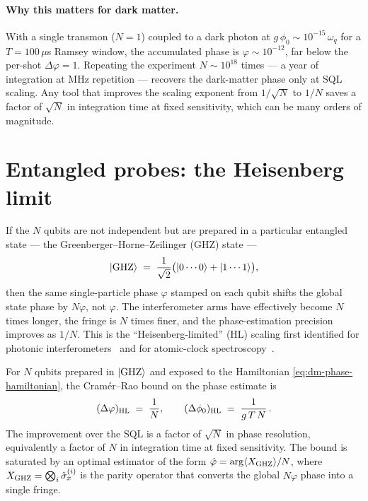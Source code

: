 \paragraph{Why this matters for dark matter.}
With a single transmon ($N=1$) coupled to a dark photon at
$g\,\phi_0\sim 10^{-15}\,\omega_q$ for a $T=100\,\mu$s
Ramsey window, the accumulated phase is $\varphi\sim 10^{-12}$,
far below the per-shot $\Delta\varphi=1$. Repeating the
experiment $N\sim 10^{18}$ times --- a year of integration
at MHz repetition --- recovers the dark-matter phase only at
SQL scaling. Any tool that improves the scaling exponent from
$1/\sqrt N$ to $1/N$ saves a factor of $\sqrt{N}$ in
integration time at fixed sensitivity, which can be
many orders of magnitude.

\section{Entangled probes: the Heisenberg limit}
\label{sec:hl}

\begin{phenomenon}
If the $N$ qubits are not independent but are prepared in a
particular entangled state --- the Greenberger--Horne--Zeilinger
(GHZ) state ---
\begin{equation}
\label{eq:ghz}
\ket{\rm GHZ} \;=\; \frac{1}{\sqrt 2}\bigl(\ket{0\cdots 0}
+ \ket{1\cdots 1}\bigr),
\end{equation}
then the same single-particle phase $\varphi$ stamped on each
qubit shifts the global state phase by $N\varphi$, not
$\varphi$. The interferometer arms have effectively become
$N$ times longer, the fringe is $N$ times finer, and the
phase-estimation precision improves as $1/N$. This is the
``Heisenberg-limited'' (HL) scaling first identified for
photonic interferometers~\cite{caves1981,giovannetti2004,giovannetti2006}
and for atomic-clock spectroscopy~\cite{wineland1992,huelga1997}.
\end{phenomenon}

\begin{statement}
\label{stmt:hl}
For $N$ qubits prepared in $\ket{\rm GHZ}$ and exposed to the
Hamiltonian \cref{eq:dm-phase-hamiltonian}, the
Cram\'{e}r--Rao bound on the phase estimate is
\begin{equation}
\label{eq:hl-bound}
(\Delta\varphi)_{\rm HL} \;=\; \frac{1}{N},
\qquad
(\Delta\phi_0)_{\rm HL} \;=\; \frac{1}{g\,T\,N}\,.
\end{equation}
The improvement over the SQL is a factor of $\sqrt{N}$ in
phase resolution, equivalently a factor of $N$ in integration
time at fixed sensitivity. The bound is saturated by an optimal
estimator of the form $\hat\varphi=\arg\langle X_{\rm GHZ}\rangle/N$,
where $X_{\rm GHZ}=\bigotimes_i\hat\sigma_x^{(i)}$ is the
parity operator that converts the global $N\varphi$ phase into
a single fringe.
\end{statement}

